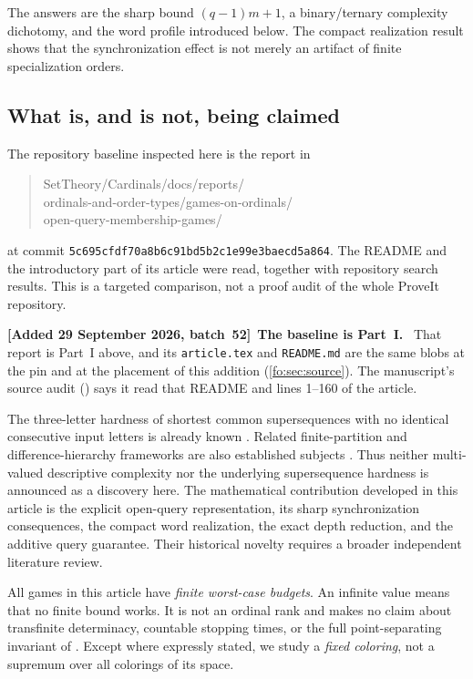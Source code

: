 \documentclass[11pt,letterpaper]{article}
\numberwithin{equation}{section}
\theoremstyle{definition}
\theoremstyle{remark}
\theoremstyle{definition}
\newenvironment{writenote}[1][]{\par\smallskip\begingroup\small\sloppy
 \noindent\textbf{[Added 29 September 2026, batch~52]}\if\relax\detokenize{#1}\relax\else~\textbf{#1.}\fi\ }%
 {\par\endgroup\smallskip}
\begin{document}
The answers are the sharp bound $(q-1)m+1$, a binary/ternary complexity
dichotomy, and the word profile introduced below. The compact realization
result shows that the synchronization effect is not merely an artifact of
finite specialization orders.

\subsection{What is, and is not, being claimed}
The repository baseline inspected here is the report in
\begin{quote}\small\ttfamily
SetTheory/Cardinals/docs/reports/\\
ordinals-and-order-types/games-on-ordinals/\\
open-query-membership-games/
\end{quote}
at commit \texttt{5c695cfdf70a8b6c91bd5b2c1e99e3baecd5a864}.
The README and the introductory part of its article were read, together with
repository search results. This is a targeted comparison, not a proof audit of
the whole ProveIt repository.

\begin{writenote}[The baseline is Part~I]
That report is Part~I above, and its \texttt{article.tex} and
\texttt{README.md} are the same blobs at the pin and at the placement of this
addition (\cref{fo:sec:source}). The manuscript's source audit
() says it read that README and lines
1--160 of the article.
\end{writenote}

The three-letter hardness of shortest common supersequences with no identical
consecutive input letters is already known \cite{LT}. Related finite-partition
and difference-hierarchy frameworks are also established subjects
\cite{Selivanov}. Thus neither multi-valued descriptive complexity nor the
underlying supersequence hardness is announced as a discovery here.
The mathematical contribution developed in this article is the explicit
open-query representation, its sharp synchronization consequences, the compact
word realization, the exact depth reduction, and the additive query guarantee.
Their historical novelty requires a broader independent literature review.

All games in this article have \emph{finite worst-case budgets}. An infinite
value means that no finite bound works. It is not an ordinal rank and makes no
claim about transfinite determinacy, countable stopping times, or the full
point-separating invariant of \cite{CCS}. Except where expressly stated, we
study a \emph{fixed coloring}, not a supremum over all colorings of its space.
\end{document}

